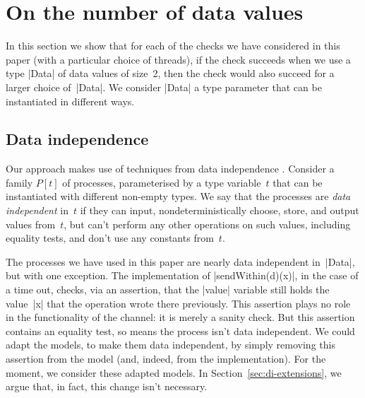 \section{On the number of data values}
\label{sec:di}

In this section we show that for each of the checks we have considered in this
paper (with a particular choice of threads), if the check succeeds when we use
a type |Data| of data values of size~2, then the check would also succeed for
a larger choice of~|Data|.  We consider |Data| a type parameter that can be
instantiated in different ways.


\subsection{Data independence}

Our approach makes use of techniques from data independence
\cite{Wolper-1986}\linebreak[1]\cite{ranko-thesis}\linebreak[1]%
\cite[Section~15.2]{awr:TPC}.  Consider a family $P[t]$ of processes,
parameterised by a type variable~$t$ that can be instantiated with different
non-empty types.  We say that the processes are \emph{data independent} in~$t$
if they can input, nondeterministically choose, store, and output values
from~$t$, but can't perform any other operations on such values, including
equality tests, and don't use any constants from~$t$.

The processes we have used in this paper are nearly data independent
in~|Data|, but with one exception. The implementation of |sendWithin(d)(x)|,
in the case of a time out, checks, via an assertion, that the |value| variable
still holds the value~|x| that the operation wrote there previously.  This
assertion plays no role in the functionality of the channel: it is merely a
sanity check.  But this assertion contains an equality test, so means the
process isn't data independent.  We could adapt the models, to make them data
independent, by simply removing this assertion from the model (and, indeed,
from the implementation).  For the moment, we consider these adapted models.
In Section~\ref{sec:di-extensions}, we argue that, in fact, this change isn't
necessary.

